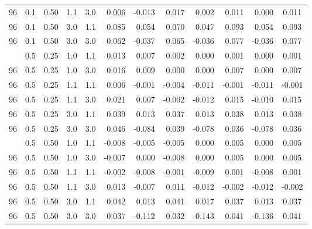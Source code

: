 \begin{longtable}[t]{cccccrrrrrrc}
96 & 0.1 & 0.50 & 1.1 & 3.0 & 0.006 & -0.013 & 0.017 & 0.002 & 0.011 & 0.000 & 0.011\\
96 & 0.1 & 0.50 & 3.0 & 1.1 & 0.085 & 0.054 & 0.070 & 0.047 & 0.093 & 0.054 & 0.093\\
96 & 0.1 & 0.50 & 3.0 & 3.0 & 0.062 & -0.037 & 0.065 & -0.036 & 0.077 & -0.036 & 0.077\\
\addlinespace
96 & 0.5 & 0.25 & 1.0 & 1.1 & 0.013 & 0.007 & 0.002 & 0.000 & 0.001 & 0.000 & 0.001\\
96 & 0.5 & 0.25 & 1.0 & 3.0 & 0.016 & 0.009 & 0.000 & 0.000 & 0.007 & 0.000 & 0.007\\
96 & 0.5 & 0.25 & 1.1 & 1.1 & 0.006 & -0.001 & -0.004 & -0.011 & -0.001 & -0.011 & -0.001\\
96 & 0.5 & 0.25 & 1.1 & 3.0 & 0.021 & 0.007 & -0.002 & -0.012 & 0.015 & -0.010 & 0.015\\
96 & 0.5 & 0.25 & 3.0 & 1.1 & 0.039 & 0.013 & 0.037 & 0.013 & 0.038 & 0.013 & 0.038\\
96 & 0.5 & 0.25 & 3.0 & 3.0 & 0.046 & -0.084 & 0.039 & -0.078 & 0.036 & -0.078 & 0.036\\
\addlinespace
96 & 0.5 & 0.50 & 1.0 & 1.1 & -0.008 & -0.005 & -0.005 & 0.000 & 0.005 & 0.000 & 0.005\\
96 & 0.5 & 0.50 & 1.0 & 3.0 & -0.007 & 0.000 & -0.008 & 0.000 & 0.005 & 0.000 & 0.005\\
96 & 0.5 & 0.50 & 1.1 & 1.1 & -0.002 & -0.008 & -0.001 & -0.009 & 0.001 & -0.008 & 0.001\\
96 & 0.5 & 0.50 & 1.1 & 3.0 & 0.013 & -0.007 & 0.011 & -0.012 & -0.002 & -0.012 & -0.002\\
96 & 0.5 & 0.50 & 3.0 & 1.1 & 0.042 & 0.013 & 0.041 & 0.017 & 0.037 & 0.013 & 0.037\\
96 & 0.5 & 0.50 & 3.0 & 3.0 & 0.037 & -0.112 & 0.032 & -0.143 & 0.041 & -0.136 & 0.041\\
\bottomrule
\end{longtable}
\endgroup{}
